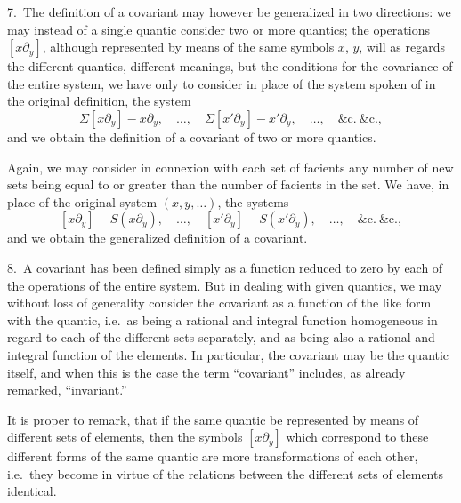 \documentclass[11pt,a4paper]{article}
\begin{document}
\medskip

7.\ The definition of a covariant may however be generalized in two directions: we may instead of a single quantic consider two or more quantics; the operations $[x\partial_y]$, although represented by means of the same symbols $x$, $y$, will as regards the different quantics, different meanings, but the conditions for the covariance of the entire system, we have only to consider in place of the system spoken of in the original definition, the system
\[
\Sigma[x\partial_y] - x\partial_y,\quad\ldots,\quad\Sigma[x'\partial_y] - x'\partial_y,\quad\ldots,\quad\&\mathrm{c}.\ \&\mathrm{c}.,
\]
and we obtain the definition of a covariant of two or more quantics.

\medskip

Again, we may consider in connexion with each set of facients any number of new sets being equal to or greater than the number of facients in the set. We have, in place of the original system $(x, y, \ldots)$, the systems
\[
[x\partial_y] - S(x\partial_y),\quad\ldots,\quad [x'\partial_y] - S(x'\partial_y),\quad\ldots,\quad\&\mathrm{c}.\ \&\mathrm{c}.,
\]
and we obtain the generalized definition of a covariant.

\medskip

8.\ A covariant has been defined simply as a function reduced to zero by each of the operations of the entire system. But in dealing with given quantics, we may without loss of generality consider the covariant as a function of the like form with the quantic, i.e.\ as being a rational and integral function homogeneous in regard to each of the different sets separately, and as being also a rational and integral function of the elements. In particular, the covariant may be the quantic itself, and when this is the case the term ``covariant'' includes, as already remarked, ``invariant.''

\medskip

It is proper to remark, that if the same quantic be represented by means of different sets of elements, then the symbols $[x\partial_y]$ which correspond to these different forms of the same quantic are more transformations of each other, i.e.\ they become in virtue of the relations between the different sets of elements identical.

\medskip
\end{document}
